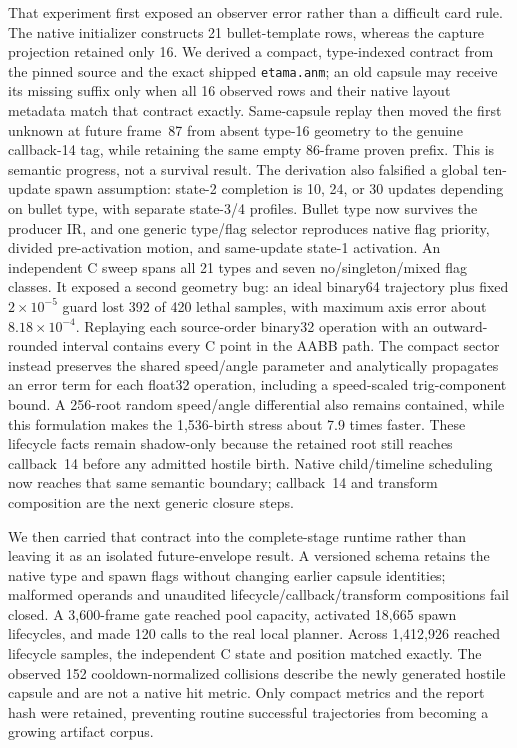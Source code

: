 \documentclass[10pt]{article}
\begin{document}
That experiment first exposed an observer error rather than a difficult card
rule.  The native initializer constructs 21 bullet-template rows, whereas the
capture projection retained only 16.  We derived a compact, type-indexed
contract from the pinned source and the exact shipped \texttt{etama.anm}; an
old capsule may receive its missing suffix only when all 16 observed rows and
their native layout metadata match that contract exactly.  Same-capsule replay
then moved the first unknown at future frame~87 from absent type-16 geometry to
the genuine callback-14 tag, while retaining the same empty 86-frame proven
prefix.  This is semantic progress, not a survival result.  The derivation
also falsified a global ten-update spawn assumption: state-2 completion is 10,
24, or 30 updates depending on bullet type, with separate state-3/4 profiles.
Bullet type now survives the producer IR, and one generic type/flag selector
reproduces native flag priority, divided pre-activation motion, and same-update
state-1 activation.  An independent C sweep spans all 21 types and seven
no/singleton/mixed flag classes.  It exposed a second geometry bug: an ideal
binary64 trajectory plus fixed $2\times10^{-5}$ guard lost 392 of 420 lethal
samples, with maximum axis error about $8.18\times10^{-4}$.  Replaying each
source-order binary32 operation with an outward-rounded interval contains
every C point in the AABB path.  The compact sector instead preserves the
shared speed/angle parameter and analytically propagates an error term for
each float32 operation, including a speed-scaled trig-component bound.  A
256-root random speed/angle differential also remains contained, while this
formulation makes the 1,536-birth stress about 7.9 times faster.  These
lifecycle facts remain shadow-only because the retained root still reaches
callback~14 before any admitted hostile birth.  Native child/timeline
scheduling now reaches that same semantic boundary; callback~14 and transform
composition are the next generic closure steps.

We then carried that contract into the complete-stage runtime rather than
leaving it as an isolated future-envelope result.  A versioned schema retains
the native type and spawn flags without changing earlier capsule identities;
malformed operands and unaudited lifecycle/callback/transform compositions
fail closed.  A 3,600-frame gate reached pool capacity, activated 18,665 spawn
lifecycles, and made 120 calls to the real local planner.  Across 1,412,926
reached lifecycle samples, the independent C state and position matched
exactly.  The observed 152 cooldown-normalized collisions describe the newly
generated hostile capsule and are not a native hit metric.  Only compact
metrics and the report hash were retained, preventing routine successful
trajectories from becoming a growing artifact corpus.
\end{document}
